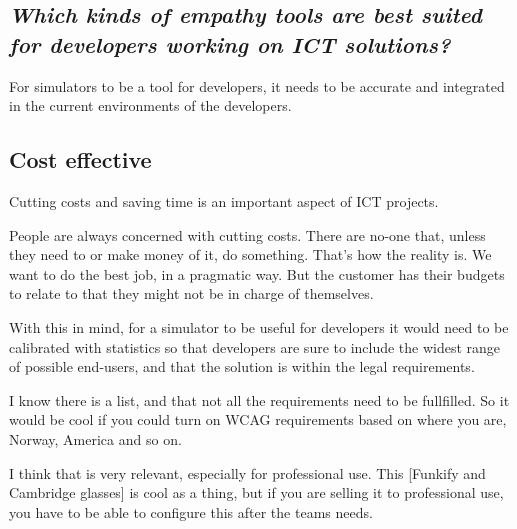 \subsection{\textit{Which kinds of empathy tools are best suited for developers working on ICT
solutions?}}
For simulators to be a tool for developers, it needs to be accurate and integrated in the current environments of the developers.

\subsection{Cost effective}
Cutting costs and saving time is an important aspect of ICT projects.

\begin{displayquote}
    People are always concerned with cutting costs. There are no-one that, unless they need to or make money of it, do something. That's how the reality is. We want to do the best job, in a pragmatic way. But the customer has their budgets to relate to that they might not be in charge of themselves.
\end{displayquote}
With this in mind, for a simulator to be useful for developers it would need to be calibrated with statistics so that developers are sure to include the widest range of possible end-users, and that the solution is within the legal requirements. 

\begin{displayquote}
    I know there is a list, and that not all the requirements need to be fullfilled. So it would be cool if you could turn on WCAG requirements based on where you are, Norway, America and so on. 
    
    I think that is very relevant, especially for professional use. This [Funkify and Cambridge glasses] is cool as a thing, but if you are selling it to professional use, you have to be able to configure this after the teams needs.
\end{displayquote}